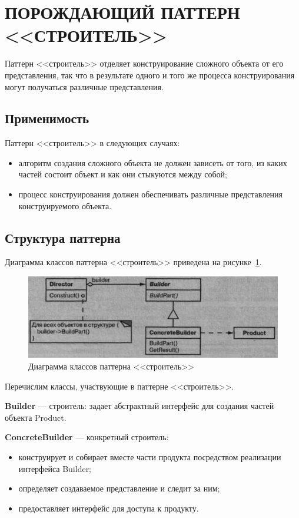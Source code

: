 \section{ПОРОЖДАЮЩИЙ ПАТТЕРН <<СТРОИТЕЛЬ>>}

Паттерн <<строитель>> отделяет конструирование сложного объекта от его представления,
так что в результате одного и того же процесса конструирования могут получаться
различные представления.

\subsection{Применимость}

Паттерн <<строитель>> в следующих случаях:
\begin{itemize}
\item
  алгоритм создания сложного объекта не должен зависеть от того, из каких
  частей состоит объект и как они стыкуются между собой;
\item
  процесс конструирования должен обеспечивать различные представления
  конструируемого объекта.
\end{itemize}

\subsection{Структура паттерна}

Диаграмма классов паттерна <<строитель>> приведена на рисунке~\ref{fig:builder_uml}.

\begin{figure}[h!]
  \centering
  \includegraphics[width=150mm]{pic/builder_uml.png}
  \caption{Диаграмма классов паттерна <<строитель>>}
  \label{fig:builder_uml}
\end{figure}

Перечислим классы, участвующие в паттерне <<строитель>>.

\textbf{Builder} --- строитель: задает абстрактный интерфейс
для создания частей объекта Product.

\textbf{ConcreteBuilder} --- конкретный строитель: 
\begin{itemize}
\item
  конструирует и собирает вместе части продукта посредством реализации
  интерфейса Builder;
\item
  определяет создаваемое представление и следит за ним;
\item
  предоставляет интерфейс для доступа к продукту.
\end{itemize}

